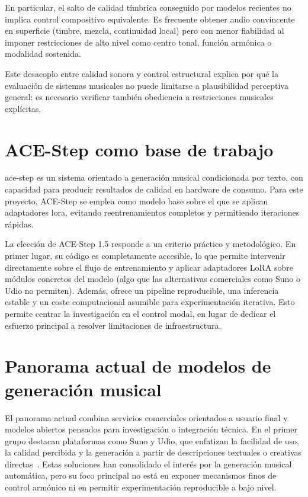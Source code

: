 \documentclass[%
    school=etsisi,%
    type=pfg,%
    degree=61CD,%
]{upm-report}
\begin{document}
En particular, el salto de calidad t\'imbrica conseguido por modelos recientes no implica control compositivo equivalente. Es frecuente obtener audio convincente en superficie (timbre, mezcla, continuidad local) pero con menor fiabilidad al imponer restricciones de alto nivel como centro tonal, funci\'on arm\'onica o modalidad sostenida.

Este desacoplo entre calidad sonora y control estructural explica por qu\'e la evaluaci\'on de sistemas musicales no puede limitarse a plausibilidad perceptiva general: es necesario verificar tambi\'en obediencia a restricciones musicales expl\'icitas.

\section{ACE-Step como base de trabajo}

\gls{ace-step} es un sistema orientado a generaci\'on musical condicionada por texto, con capacidad para producir resultados de calidad en hardware de consumo. Para este proyecto, ACE-Step se emplea como modelo base sobre el que se aplican adaptadores \gls{lora}, evitando reentrenamientos completos y permitiendo iteraciones r\'apidas.

La elecci\'on de ACE-Step 1.5 responde a un criterio pr\'actico y metodol\'ogico. En primer lugar, su c\'odigo es completamente accesible, lo que permite intervenir directamente sobre el flujo de entrenamiento y aplicar adaptadores LoRA sobre m\'odulos concretos del modelo (algo que las alternativas comerciales como Suno o Udio no permiten). Adem\'as, ofrece un pipeline reproducible, una inferencia estable y un coste computacional asumible para experimentaci\'on iterativa. Esto permite centrar la investigaci\'on en el control modal, en lugar de dedicar el esfuerzo principal a resolver limitaciones de infraestructura.

\section{Panorama actual de modelos de generaci\'on musical}

El panorama actual combina servicios comerciales orientados a usuario final y modelos abiertos pensados para investigaci\'on o integraci\'on t\'ecnica. En el primer grupo destacan plataformas como Suno y Udio, que enfatizan la facilidad de uso, la calidad percibida y la generaci\'on a partir de descripciones textuales o creativas directas~\cite{suno2026home,udio2026home}. Estas soluciones han consolidado el inter\'es por la generaci\'on musical autom\'atica, pero su foco principal no est\'a en exponer mecanismos finos de control arm\'onico ni en permitir experimentaci\'on reproducible a bajo nivel.
\end{document}
